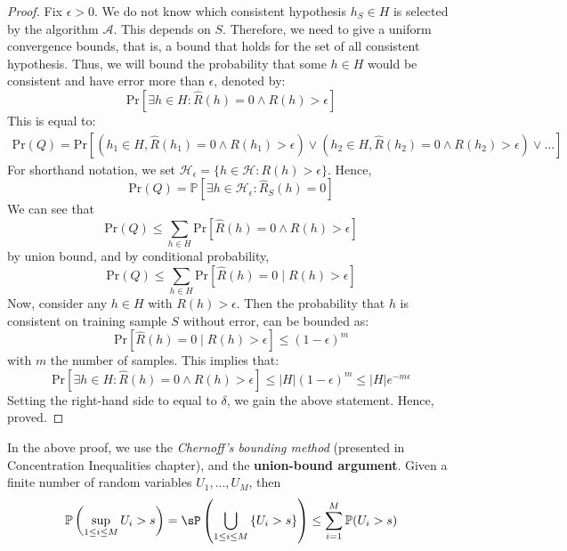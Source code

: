 \begin{proof}
    Fix $\epsilon>0$. We do not know which consistent hypothesis $h_{S}\in H$ is selected by the algorithm $\mathcal{A}$. This depends on $S$. Therefore, we need to give a uniform convergence bounds, that is, a bound that holds for the set of all consistent hypothesis. Thus, we will bound the probability that some $h\in H$ would be consistent and have error more than $\epsilon$, denoted by: $$\mathrm{Pr}[\exists h\in H: \hat{R}(h)=0 \land R(h) > \epsilon]$$
This is equal to: 
\begin{multline*}
    \mathrm{Pr}(Q)=\mathrm{Pr}[(h_{1}\in H, \hat{R}(h_{1}) = 0 \land R(h_{1}) > \epsilon) \lor (h_{2}\in H, \hat{R}(h_{2}) = 0 \land R(h_{2}) > \epsilon)\lor\dots]
\end{multline*}
For shorthand notation, we set $\mathcal{H}_{\epsilon}=\{ h\in \mathcal{H} : R(h) > \epsilon \}$. Hence, 
\begin{equation*}
    \mathrm{Pr}(Q)=\mathbb{P}[\exists h\in \mathcal{H}_{\epsilon}: \hat{R}_{S}(h) = 0]
\end{equation*}
We can see that $$\mathrm{Pr}(Q)\leq \sum_{h\in H} \mathrm{Pr}[\hat{R}(h) = 0 \land R(h) > \epsilon]$$
by union bound, and by conditional probability, $$\mathrm{Pr}(Q)\leq \sum_{h\in H} \mathrm{Pr}[\hat{R}(h) = 0 \mid R(h) > \epsilon]$$
Now, consider any $h\in H$ with $R(h)>\epsilon$. Then the probability that $h$ is consistent on training sample $S$ without error, can be bounded as: $$\mathrm{Pr}[\hat{R}(h)=0 \mid R(h) > \epsilon] \leq (1-\epsilon)^{m}$$
with $m$ the number of samples. This implies that: $$\mathrm{Pr}[\exists h\in H: \hat{R}(h)=0 \land R(h) > \epsilon]\leq \lvert H \rvert (1-\epsilon)^{m}\leq \lvert H \rvert e^{-m\epsilon}$$
Setting the right-hand side to equal to $\delta$, we gain the above statement. Hence, proved. 
\end{proof}

\begin{remark}
    In the above proof, we use the \textit{Chernoff's bounding method} (presented in Concentration Inequalities chapter), and the \textbf{union-bound argument}. Given a finite number of random variables $U_{1},\dots,U_{M}$, then 
    \begin{equation}
        \mathbb{P}\left(\sup_{1\leq i \leq M}U_{i}> s\right) = \sP \left(\bigcup_{1\leq i\leq M}\left\{ U_{i} > s \right\}\right) \leq \sum^{M}_{i=1}\mathbb{P}(U_{i}>s)
    \end{equation}
\end{remark}


